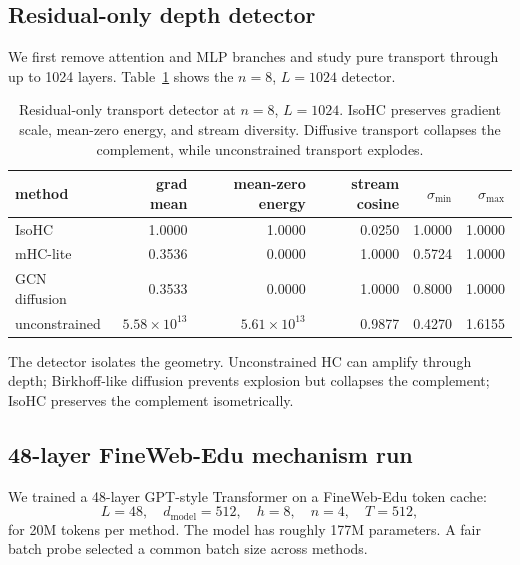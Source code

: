 \documentclass[10pt]{article}
\begin{document}
\subsection{Residual-only depth detector}

We first remove attention and MLP branches and study pure transport through up
to 1024 layers.  Table~\ref{tab:detector} shows the $n=8$, $L=1024$ detector.

\begin{table}[t]
\centering
\caption{Residual-only transport detector at $n=8$, $L=1024$.  IsoHC preserves
gradient scale, mean-zero energy, and stream diversity.  Diffusive transport
collapses the complement, while unconstrained transport explodes.}
\label{tab:detector}
\begin{tabular}{lrrrrr}
\toprule
method & grad mean & mean-zero energy & stream cosine & $\sigma_{\min}$ & $\sigma_{\max}$ \\
\midrule
IsoHC & 1.0000 & 1.0000 & 0.0250 & 1.0000 & 1.0000 \\
mHC-lite & 0.3536 & 0.0000 & 1.0000 & 0.5724 & 1.0000 \\
GCN diffusion & 0.3533 & 0.0000 & 1.0000 & 0.8000 & 1.0000 \\
unconstrained & $5.58{\times}10^{13}$ & $5.61{\times}10^{13}$ & 0.9877 & 0.4270 & 1.6155 \\
\bottomrule
\end{tabular}
\end{table}

The detector isolates the geometry.  Unconstrained HC can amplify through depth;
Birkhoff-like diffusion prevents explosion but collapses the complement; IsoHC
preserves the complement isometrically.

\subsection{48-layer FineWeb-Edu mechanism run}

We trained a 48-layer GPT-style Transformer on a FineWeb-Edu token cache:
\begin{equation}
    L=48,\quad d_{\mathrm{model}}=512,\quad h=8,\quad n=4,\quad T=512,
\end{equation}
for 20M tokens per method.  The model has roughly 177M parameters.  A fair batch
probe selected a common batch size across methods.
\end{document}
